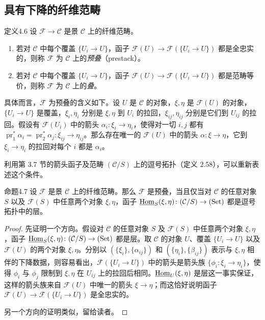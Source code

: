 \subsection{具有下降的纤维范畴}
\begin{origstatement}{定义}{4.6}\label{ch04:def46}
设 $\mathcal F\to\mathcal C$ 是景 $\mathcal C$ 上的纤维范畴。
\begin{enumerate}
 \item[(i)] 若对 $\mathcal C$ 中每个覆盖 $\{U_i\to U\}$，函子 $\mathcal F(U)\to\mathcal F(\{U_i\to U\})$ 都是全忠实的，则称 $\mathcal F$ 为 $\mathcal C$ 上的\emph{预叠}（prestack）。
 \item[(ii)] 若对 $\mathcal C$ 中每个覆盖 $\{U_i\to U\}$，函子 $\mathcal F(U)\to\mathcal F(\{U_i\to U\})$ 都是范畴等价，则称 $\mathcal F$ 为 $\mathcal C$ 上的\emph{叠}。
\end{enumerate}
\end{origstatement}

具体而言，$\mathcal F$ 为预叠的含义如下。设 $U$ 是 $\mathcal C$ 的对象，$\xi,\eta$ 是 $\mathcal F(U)$ 的对象，$\{U_i\to U\}$ 是覆盖，$\xi_i,\eta_i$ 分别是 $\xi,\eta$ 到 $U_i$ 的拉回，$\xi_{ij},\eta_{ij}$ 分别是它们到 $U_{ij}$ 的拉回。假设有 $\mathcal F(U_i)$ 中的箭头 $\alpha_i\colon\xi_i\to\eta_i$，使得对一切 $i,j$ 都有 $\operatorname{pr}_1^*\alpha_i=\operatorname{pr}_2^*\alpha_j\colon\xi_{ij}\to\eta_{ij}$。那么存在唯一的 $\mathcal F(U)$ 中的箭头 $\alpha\colon\xi\to\eta$，它到 $\xi_i\to\eta_i$ 的拉回对每个 $i$ 都是 $\alpha_i$。

利用第 3.7 节的箭头函子及范畴 $(\mathcal C/S)$ 上的逗号拓扑（定义 2.58），可以重新表述这个条件。

\begin{origstatement}{命题}{4.7}\label{ch04:prop47}
设 $\mathcal F$ 是景 $\mathcal C$ 上的纤维范畴。那么 $\mathcal F$ 是预叠，当且仅当对 $\mathcal C$ 的任意对象 $S$ 以及 $\mathcal F(S)$ 中任意两个对象 $\xi,\eta$，函子
$\underline{\operatorname{Hom}}_S(\xi,\eta)\colon(\mathcal C/S)\to(\mathrm{Set})$ 都是逗号拓扑中的层。
\end{origstatement}
\begin{proof}
先证明一个方向。假设对 $\mathcal C$ 的任意对象 $S$ 及 $\mathcal F(S)$ 中任意两个对象 $\xi,\eta$，函子 $\underline{\operatorname{Hom}}_S(\xi,\eta)\colon(\mathcal C/S)\to(\mathrm{Set})$ 都是层。取 $\mathcal C$ 的对象 $U$、覆盖 $\{U_i\to U\}$ 以及 $\mathcal F(U)$ 的两个对象 $\xi,\eta$。分别以 $(\{\xi_i\},\{\alpha_{ij}\})$ 和 $(\{\eta_i\},\{\beta_{ij}\})$ 表示与 $\xi,\eta$ 相伴的下降数据，则容易看出，$\mathcal F(\{U_i\to U\})$ 中的箭头是箭头族 $\{\phi_i\colon\xi_i\to\eta_i\}$，使得 $\phi_i$ 与 $\phi_j$ 限制到 $\xi,\eta$ 在 $U_{ij}$ 上的拉回后相同。$\underline{\operatorname{Hom}}_U(\xi,\eta)$ 是层这一事实保证，这样的箭头族来自 $\mathcal F(U)$ 中唯一的箭头 $\xi\to\eta$；而这恰好说明函子 $\mathcal F(U)\to\mathcal F(\{U_i\to U\})$ 是全忠实的。

另一个方向的证明类似，留给读者。
\end{proof}

